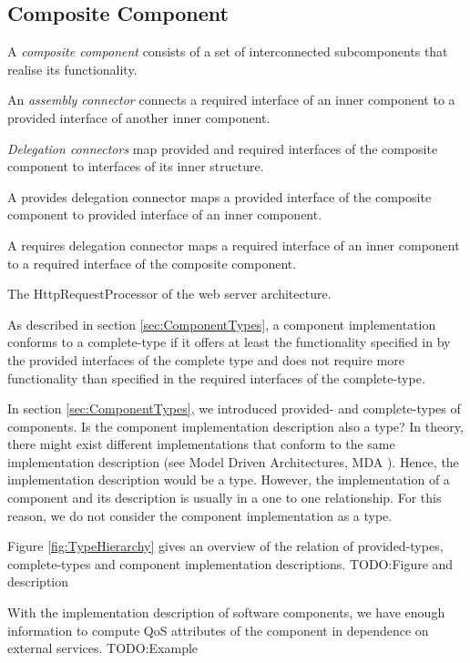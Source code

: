 \subsection{Composite Component}
A \emph{composite component} consists of a set of interconnected subcomponents that
realise its functionality. 

An \emph{assembly connector} connects a required interface of an inner component to a provided interface
of another inner component. 

\emph{Delegation connectors} map provided and required
interfaces of the composite component to interfaces of its inner
structure. 

A provides delegation connector maps
a provided interface of the composite component to provided interface of an
inner component. 

A requires delegation connector maps a required interface of an
inner component to a required interface of the composite component.

The HttpRequestProcessor of the web server architecture.

As described in section \ref{sec:ComponentTypes}, a component implementation
conforms to a complete-type if it offers at least the functionality specified
in by the provided interfaces of the complete type and does not require more
functionality than specified in the required interfaces of the complete-type.

In section \ref{sec:ComponentTypes}, we introduced provided- and complete-types
of components. Is the component implementation description also a type? In
theory, there might exist different implementations that conform to the same
implementation description (see Model Driven Architectures, MDA
\cite{TODO:reference}). Hence, the implementation description would be a
type. However, the implementation of a component and its description is
usually in a one to one relationship. For this reason, we do not consider the
component implementation as a type. 

Figure \ref{fig:TypeHierarchy} gives an overview of the relation of
provided-types, complete-types and component implementation descriptions.
TODO:Figure and description

With the implementation description of software components, we have enough
information to compute QoS attributes of the component in dependence on external
services.
TODO:Example
